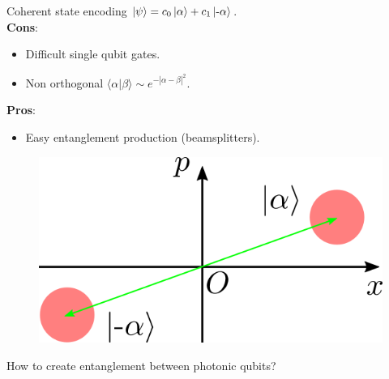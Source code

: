 \documentclass{beamer}
\begin{document}
\begin{frame}
\begin{center}

Coherent state encoding $\ket{\psi} = c_0 \ket{\alpha} + c_1 \ket{ \text{-} \alpha}$.\\
\textbf{Cons}:
\begin{itemize}
\item Difficult single qubit gates. 
\item Non orthogonal $\langle \alpha | \beta \rangle \sim e^{-|\alpha- \beta|^2}$.
\end{itemize}
\textbf{Pros}:
\begin{itemize}
\item Easy entanglement production (beamsplitters).
\end{itemize}

\begin{figure}[!htb]
\centering
\includegraphics[scale=.4]{immagini/coherent.png}
\end{figure}

\end{center}
\end{frame}

\begin{frame}
\begin{center}
\begin{block}{}
\begin{center}
How to create entanglement between photonic qubits?
\end{center}
\end{block}
\end{center}
\end{frame}
\end{document}
